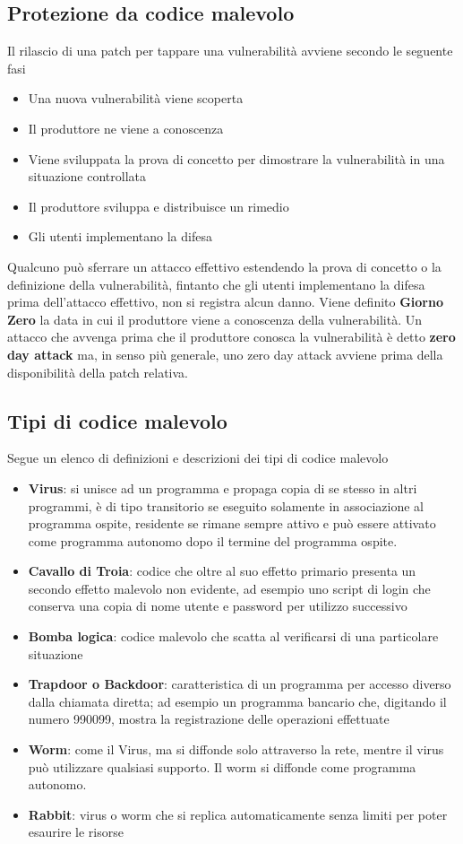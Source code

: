 \subsection{Protezione da codice malevolo}
Il rilascio di una patch per tappare una vulnerabilità avviene secondo le seguente fasi
\begin{itemize}
\item Una nuova vulnerabilità viene scoperta
\item Il produttore ne viene a conoscenza
\item Viene sviluppata la prova di concetto per dimostrare la vulnerabilità in una situazione controllata
\item Il produttore sviluppa e distribuisce un rimedio
\item Gli utenti implementano la difesa
\end{itemize}
Qualcuno può sferrare un attacco effettivo estendendo la prova di concetto o la definizione della vulnerabilità, fintanto che gli utenti implementano la difesa prima dell'attacco effettivo, non si registra alcun danno.
Viene definito \textbf{Giorno Zero} la data in cui il produttore viene a conoscenza della vulnerabilità.
Un attacco che avvenga prima che il produttore conosca la vulnerabilità è detto \textbf{zero day attack} ma, in senso più generale, uno zero day attack avviene prima della disponibilità della patch relativa.

\subsection{Tipi di codice malevolo}
Segue un elenco di definizioni e descrizioni dei tipi di codice malevolo
\begin{itemize}

	\item \textbf{Virus}: si unisce ad un programma e propaga copia di se stesso in altri programmi, è di tipo transitorio se eseguito solamente in associazione al programma ospite, residente se rimane sempre attivo e può essere attivato come programma autonomo dopo il termine del programma ospite.
	\item \textbf{Cavallo di Troia}: codice che oltre al suo effetto primario presenta un secondo effetto malevolo non evidente, ad esempio uno script di login che conserva una copia di nome utente e password per utilizzo successivo
	\item \textbf{Bomba logica}: codice malevolo che scatta al verificarsi di una particolare situazione
	\item \textbf{Trapdoor o Backdoor}: caratteristica di un programma per accesso diverso dalla chiamata diretta; ad esempio un programma bancario che, digitando il numero 990099, mostra la registrazione delle operazioni effettuate
	\item \textbf{Worm}: come il Virus, ma si diffonde solo attraverso la rete, mentre il virus può utilizzare qualsiasi supporto. Il worm si diffonde come programma autonomo.
	\item \textbf{Rabbit}: virus o worm che si replica automaticamente senza limiti per poter esaurire le risorse
\end{itemize}

